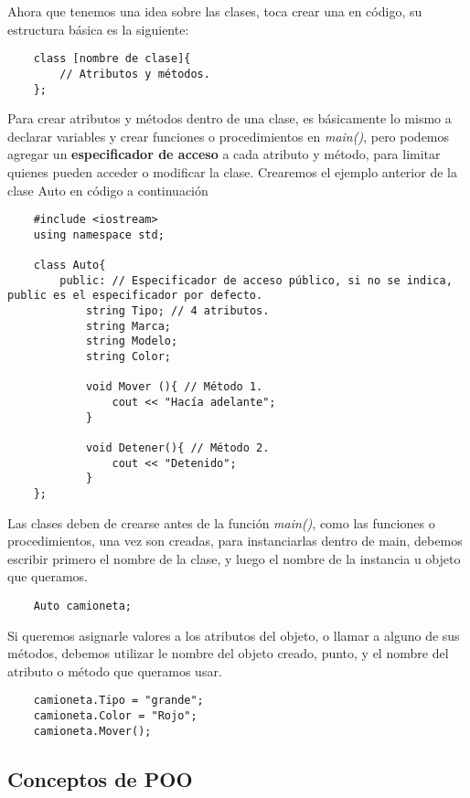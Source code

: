 Ahora que tenemos una idea sobre las clases, toca crear una en código, su estructura básica es la siguiente:
\begin{lstlisting}
    class [nombre de clase]{
        // Atributos y métodos.
    };
\end{lstlisting}

Para crear atributos y métodos dentro de una clase, es básicamente lo mismo a declarar variables y crear funciones o procedimientos en \textit{main()}, pero podemos agregar un \textbf{especificador de acceso} a cada atributo y método, para limitar quienes pueden acceder o modificar la clase. Crearemos el ejemplo anterior de la clase Auto en código a continuación
\begin{lstlisting}
    #include <iostream>
    using namespace std;

    class Auto{
        public: // Especificador de acceso público, si no se indica, public es el especificador por defecto.
            string Tipo; // 4 atributos.
            string Marca;
            string Modelo;
            string Color;
            
            void Mover (){ // Método 1.
                cout << "Hacía adelante";
            }
            
            void Detener(){ // Método 2.
                cout << "Detenido";
            }
    };
\end{lstlisting}

Las clases deben de crearse antes de la función \textit{main()}, como las funciones o procedimientos, una vez son creadas, para instanciarlas dentro de main, debemos escribir primero el nombre de la clase, y luego el nombre de la instancia u objeto que queramos.
\begin{lstlisting}
    Auto camioneta;
\end{lstlisting}

Si queremos asignarle valores a los atributos del objeto, o llamar a alguno de sus métodos, debemos utilizar le nombre del objeto creado, punto, y el nombre del atributo o método que queramos usar.
\begin{lstlisting}
    camioneta.Tipo = "grande";
    camioneta.Color = "Rojo";
    camioneta.Mover();
\end{lstlisting}


\subsection{Conceptos de POO}


